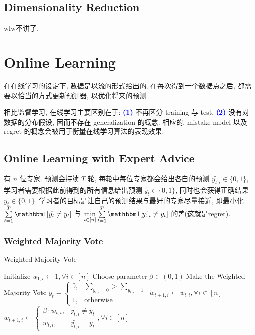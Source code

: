 \documentclass[8pt]{article}
\theoremstyle{compact}
\def\num#1{\textnormal{\textbf{\mbox{\textcolor{blue}{(#1)}}}}}
\begin{document}
\subsection{Dimensionality Reduction}
wlw不讲了.

\newpage
\section{Online Learning}
在在线学习的设定下, 数据是以流的形式给出的, 在每次得到一个数据点之后, 都需要以恰当的方式更新预测器, 以优化将来的预测.

相比监督学习, 在线学习主要区别在于: \num{1} 不再区分 training 与 test, \num{2} 没有对数据的分布假设, 因而不存在 generalization 的概念. 相应的, mistake model 以及 regret 的概念会被用于衡量在线学习算法的表现效果.

\subsection{Online Learning with Expert Advice}

有 $n$ 位专家. 预测会持续 $T$ 轮, 每轮中每位专家都会给出各自的预测 $\tilde{y_{t, i}} \in \{0, 1\}$, 学习者需要根据此前得到的所有信息给出预测 $\tilde{y_t} \in \{0, 1\}$, 同时也会获得正确结果 $y_t \in \{0, 1\}$. 学习者的目标是让自己的预测结果与最好的专家尽量接近, 即最小化 $\sum\limits_{t=1}^{T}\mathbbm 1[\tilde{y_t} \neq y_t]$ 与 $\min\limits_{i \in [n]}\sum\limits_{t=1}^{T}\mathbbm 1[\tilde{y_{t, i}} \neq y_t]$ 的差(这就是regret).

\subsubsection{Weighted Majority Vote}
\begin{algorithm}
	\caption{Weighted Majority Vote}
	\begin{algorithmic}[1]
		\State Initialize $w_{1, i} \gets 1, \forall i \in [n]$
		\State Choose parameter $\beta \in (0, 1)$
			\State Make the Weighted Majority Vote $\tilde{y_t} = \begin{cases}
				0, & \sum\limits_{\tilde{y_{t, i}} = 0} >  \sum\limits_{\tilde{y_{t, i}} = 1}\\
				1, & \text{otherwise}
			\end{cases}$
				\State $w_{t + 1, i} \gets w_{t, i}, \forall i \in [n]$
			\Else
			\State $w_{t + 1, i} \gets \begin{cases}
				\beta \cdot w_{t, i}, & \tilde{y_{t, i}} \neq y_t\\
				w_{t, i}, & \tilde{y_{t, i}} = y_t
			\end{cases}, \forall i \in [n]$
			\EndIf

		\EndFor
	\end{algorithmic}
\end{algorithm}
\end{document}
